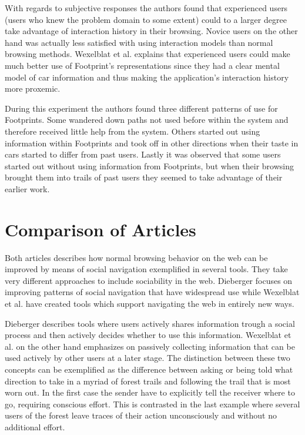 \documentclass[12pt,a4paper]{article}
\begin{document}
With regards to subjective responses the authors found that experienced users
(users who knew the problem domain to some extent) could to a larger degree
take advantage of interaction history in their browsing. Novice users on the
other hand was actually less satisfied with using interaction models than
normal browsing methods. Wexelblat et al. explains that experienced users
could make much better use of Footprint's representations since they had a
clear mental model of car information and thus making the application's
interaction history more proxemic.

During this experiment the authors found three different patterns of use for
Footprints. Some wandered down paths not used before within the system and
therefore received little help from the system. Others started out using
information within Footprints and took off in other directions when their
taste in cars started to differ from past users. Lastly it was observed that
some users started out without using information from Footprints, but when
their browsing brought them into trails of past users they seemed to take
advantage of their earlier work.

\section{Comparison of Articles}

Both articles describes how normal browsing behavior on the web can be
improved by means of social navigation exemplified in several tools. They take
very different approaches to include sociability in the web. Dieberger focuses
on improving patterns of social navigation that have widespread use while
Wexelblat et al. have created tools which support navigating the web in
entirely new ways.

Dieberger describes tools where users actively shares information trough a
social process and then actively decides whether to use this information.
Wexelblat et al. on the other hand emphasizes on passively collecting
information that can be used actively by other users at a later stage. The
distinction between these two concepts can be exemplified as the difference
between asking or being told what direction to take in a myriad of forest
trails and following the trail that is most worn out. In the first case the
sender have to explicitly tell the receiver where to go, requiring conscious
effort. This is contrasted in the last example where several users of the
forest leave traces of their action unconsciously and without no additional
effort.
\end{document}
